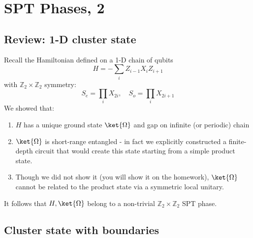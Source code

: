 \section{SPT Phases, 2}

\subsection{Review: 1-D cluster state}
Recall the Hamiltonian defined on a 1-D chain of qubits
\begin{equation}
    H = -\sum_i Z_{i-1}X_iZ_{i+1}
\end{equation}
with $\mathbb{Z}_2 \times \mathbb{Z}_2$ symmetry:
\begin{equation}
    S_e = \prod_i X_{2i}, \quad S_o = \prod_{i}X_{2i+1}
\end{equation}
We showed that:
\begin{enumerate}
    \item $H$ has a unique ground state $\ket{\Omega}$ and gap on infinite (or periodic) chain
    \item $\ket{\Omega}$ is short-range entangled - in fact we explicitly constructed a finite-depth circuit that would create this state starting from a simple product state.
    \item Though we did not show it (you will show it on the homework), $\ket{\Omega}$ cannot be related to the product state via a symmetric local unitary.
\end{enumerate}
It follows that $H, \ket{\Omega}$ belong to a non-trivial $\mathbb{Z}_2 \times \mathbb{Z}_2$ SPT phase.

\subsection{Cluster state with boundaries}

